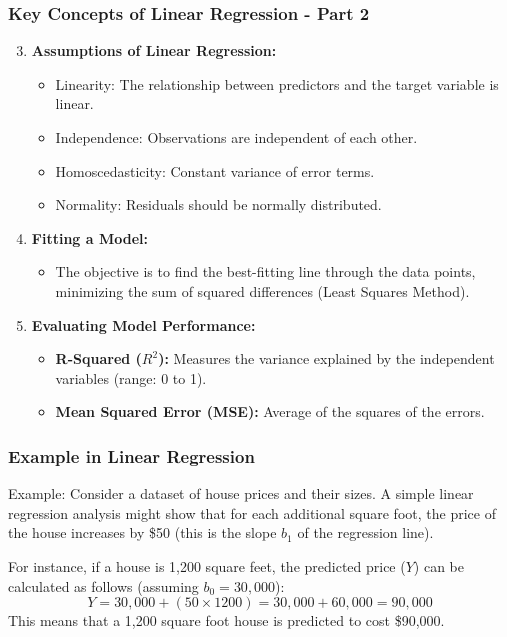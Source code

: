 \documentclass[aspectratio=169]{beamer}
\begin{document}
\begin{frame}[fragile]
    \frametitle{Key Concepts of Linear Regression - Part 2}
    \begin{enumerate}
        \setcounter{enumi}{2}
        \item \textbf{Assumptions of Linear Regression:}
            \begin{itemize}
                \item Linearity: The relationship between predictors and the target variable is linear.
                \item Independence: Observations are independent of each other.
                \item Homoscedasticity: Constant variance of error terms.
                \item Normality: Residuals should be normally distributed.
            \end{itemize}

        \item \textbf{Fitting a Model:}
            \begin{itemize}
                \item The objective is to find the best-fitting line through the data points, minimizing the sum of squared differences (Least Squares Method).
            \end{itemize}

        \item \textbf{Evaluating Model Performance:}
            \begin{itemize}
                \item \textbf{R-Squared (\(R^2\)):} Measures the variance explained by the independent variables (range: 0 to 1).
                \item \textbf{Mean Squared Error (MSE):} Average of the squares of the errors.
            \end{itemize}
    \end{enumerate}
\end{frame}

\begin{frame}[fragile]
    \frametitle{Example in Linear Regression}
    \begin{block}{Example:}
        Consider a dataset of house prices and their sizes. A simple linear regression analysis might show that for each additional square foot, the price of the house increases by \$50 (this is the slope \(b_1\) of the regression line). 

        For instance, if a house is 1,200 square feet, the predicted price (\(Y\)) can be calculated as follows (assuming \(b_0 = 30,000\)):
        \begin{equation}
        Y = 30,000 + (50 \times 1200) = 30,000 + 60,000 = 90,000
        \end{equation}
        This means that a 1,200 square foot house is predicted to cost \$90,000.
    \end{block}
\end{frame}
\end{document}
